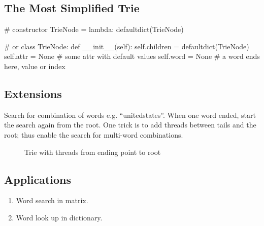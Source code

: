 \subsection{The Most Simplified Trie}
\begin{python}
# constructor 
TrieNode = lambda: defaultdict(TrieNode) 

# or
class TrieNode:
    def __init__(self):
        self.children = defaultdict(TrieNode)
        self.attr = None  # some attr with default values
        self.word = None  # a word ends here, value or index
\end{python}
\subsection{Extensions}
 Search for combination of words e.g. ``unitedstates''.  When one word ended, start the search again from the root. One trick is to add threads between tails and the root; thus enable the search for multi-word combinations. 
\begin{figure}[!hbt]
\centering
{}
\caption{Trie with threads from ending point to root}
\label{fig:trie2}
\end{figure}
\subsection{Applications}
\begin{enumerate}
\item Word search in matrix.
\item Word look up in dictionary.
\end{enumerate}
        
